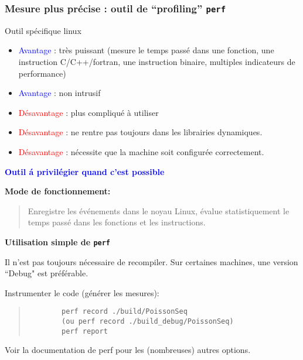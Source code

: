 \documentclass{beamer}
\begin{document}
\begin{frame}
	\frametitle{Mesure plus pr\'ecise : outil de ``profiling'' {\tt perf}}
		
	\vfill
	Outil spécifique linux
	
	\begin{itemize}
		\item \textcolor{blue}{Avantage} : tr\`es puissant (mesure le temps pass\'e dans une fonction, une instruction C/C++/fortran, une instruction binaire, multiples indicateurs de performance)
		\item \textcolor{blue}{Avantage} : non intrusif
		\item \textcolor{red}{D\'esavantage} : plus compliqu\'e \`a utiliser
		\item \textcolor{red}{D\'esavantage} : ne rentre pas toujours dans les librairies dynamiques.
		\item \textcolor{red}{D\'esavantage} : n\'ecessite que la machine soit configur\'ee  correctement.
	\end{itemize}
	\vfill
	\textcolor{blue}{\bf Outil \'a privil\'egier quand c'est possible}
\end{frame}
\begin{frame}[fragile]
	
	{\bf 	Mode de fonctionnement:}
	\begin{quote}
		Enregistre les \'ev\'enements dans le noyau Linux, \'evalue statistiquement le temps pass\'e dans les fonctions et les instructions.
	\end{quote} 
	
	\vfill
	{\bf Utilisation simple de {\tt perf}}
	\vfill
	
	Il n'est pas toujours n\'ecessaire de recompiler. Sur certaines machines, une version ``Debug" est pr\'ef\'erable. 
	
	\vfill
	Instrumenter le code (g\'en\'erer les mesures):
	\begin{quote}
		\begin{verbatim}
		perf record ./build/PoissonSeq
		(ou perf record ./build_debug/PoissonSeq)
		perf report
		\end{verbatim}
	\end{quote} 
	
	\vfill
	Voir la documentation de perf pour les (nombreuses) autres options.
	
	\vfill
\end{frame}
\end{document}
